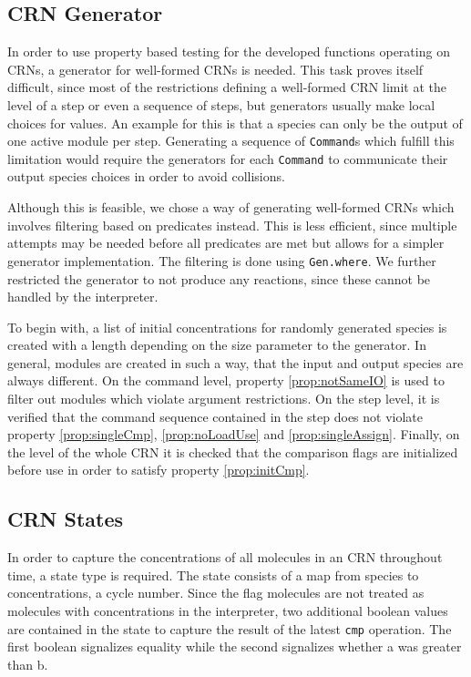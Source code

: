 \subsection{CRN Generator} %
In order to use property based testing for the developed functions operating on CRNs, a generator for well-formed CRNs is needed. This task proves itself difficult, since most of the restrictions defining a well-formed CRN limit at the level of a step or even a sequence of steps, but generators usually make local choices for values. An example for this is that a species can only be the output of one active module per step. Generating a sequence of \texttt{Command}s which fulfill this limitation would require the generators for each \texttt{Command} to communicate their output species choices in order to avoid collisions. 

Although this is feasible, we chose a way of generating well-formed CRNs which involves filtering based on predicates instead. This is less efficient, since multiple attempts may be needed before all predicates are met but allows for a simpler generator implementation. The filtering is done using \texttt{Gen.where}. We further restricted the generator to not produce any reactions, since these cannot be handled by the interpreter.

To begin with, a list of initial concentrations for randomly generated species is created with a length depending on the size parameter to the generator. In general, modules are created in such a way, that the input and output species are always different. On the command level, property \ref{prop:notSameIO} is used to filter out modules which violate argument restrictions. On the step level, it is verified that the command sequence contained in the step does not violate property \ref{prop:singleCmp}, \ref{prop:noLoadUse} and \ref{prop:singleAssign}. Finally, on the level of the whole CRN it is checked that the comparison flags are initialized before use in order to satisfy property \ref{prop:initCmp}.

\subsection{CRN States}\label{sec:states} %
In order to capture the concentrations of all molecules in an CRN throughout time, a state type is required. The state consists of a map from species to concentrations, a cycle number. Since the flag molecules are not treated as molecules with concentrations in the interpreter, two additional boolean values are contained in the state to capture the result of the latest \texttt{cmp} operation. The first boolean signalizes equality while the second signalizes whether a was greater than b. 

